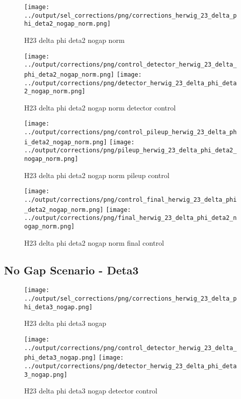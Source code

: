 \documentclass[11pt]{book}
\begin{document}
\begin{figure}[ht]
\centering
\texttt{[image: ../output/sel\_corrections/png/corrections\_herwig\_23\_delta\_phi\_deta2\_nogap\_norm.png]}
\caption{H23 delta phi deta2 nogap norm}
\label{fig:H23_delta_phi_deta2_nogap_norm}
\end{figure}


\begin{figure}[ht]
\centering
\texttt{[image: ../output/corrections/png/control\_detector\_herwig\_23\_delta\_phi\_deta2\_nogap\_norm.png]}
\texttt{[image: ../output/corrections/png/detector\_herwig\_23\_delta\_phi\_deta2\_nogap\_norm.png]}
\caption{H23 delta phi deta2 nogap norm detector control}
\label{fig:H23_delta_phi_deta2_nogap_norm_detector_control}
\end{figure}

\begin{figure}[ht]
\centering
\texttt{[image: ../output/corrections/png/control\_pileup\_herwig\_23\_delta\_phi\_deta2\_nogap\_norm.png]}
\texttt{[image: ../output/corrections/png/pileup\_herwig\_23\_delta\_phi\_deta2\_nogap\_norm.png]}
\caption{H23 delta phi deta2 nogap norm pileup control}
\label{fig:H23_delta_phi_deta2_nogap_norm_pileup_control}
\end{figure}


\begin{figure}[ht]
\centering
\texttt{[image: ../output/corrections/png/control\_final\_herwig\_23\_delta\_phi\_deta2\_nogap\_norm.png]}
\texttt{[image: ../output/corrections/png/final\_herwig\_23\_delta\_phi\_deta2\_nogap\_norm.png]}
\caption{H23 delta phi deta2 nogap norm final control}
\label{fig:H23_delta_phi_deta2_nogap_norm_final_control}
\end{figure}



\clearpage
\subsection{No Gap Scenario - Deta3}
\begin{figure}[ht]
\centering
\texttt{[image: ../output/sel\_corrections/png/corrections\_herwig\_23\_delta\_phi\_deta3\_nogap.png]}
\caption{H23 delta phi deta3 nogap}
\label{fig:H23_delta_phi_deta3_nogap}
\end{figure}


\begin{figure}[ht]
\centering
\texttt{[image: ../output/corrections/png/control\_detector\_herwig\_23\_delta\_phi\_deta3\_nogap.png]}
\texttt{[image: ../output/corrections/png/detector\_herwig\_23\_delta\_phi\_deta3\_nogap.png]}
\caption{H23 delta phi deta3 nogap detector control}
\label{fig:H23_delta_phi_deta3_nogap_detector_control}
\end{figure}
\end{document}
